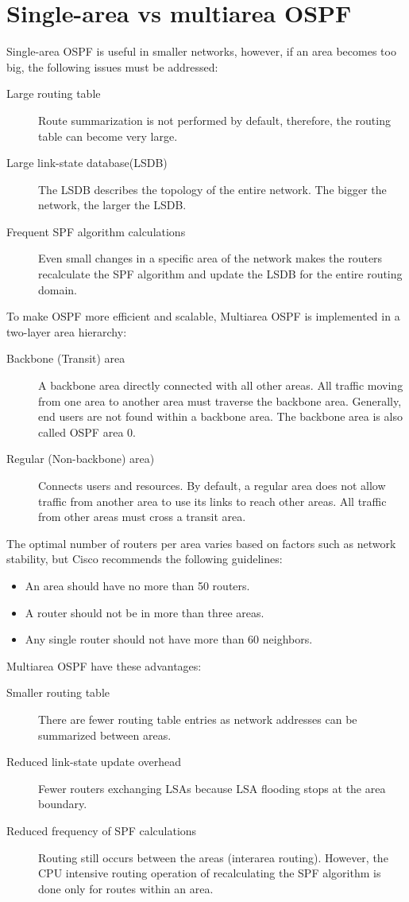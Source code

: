 \section{Single-area vs multiarea OSPF }
Single-area OSPF is useful in smaller networks, however, if an area becomes too big, the following issues must be addressed:
\begin{description}
	\item[Large routing table] Route summarization is not performed by default, therefore, the routing table can become very large.
	\item[Large link-state database(LSDB)] The LSDB describes the topology of the entire network. The bigger the network, the larger the LSDB.
	\item[Frequent SPF algorithm calculations] Even small changes in a specific area of the network makes the routers recalculate the SPF algorithm and update the LSDB for the entire routing domain.
	\end{description}
To make OSPF more efficient and scalable, Multiarea OSPF is implemented in a two-layer area hierarchy:
\begin{description}
	\item[Backbone (Transit) area] A backbone area directly connected with all other areas. All traffic moving from one area to another area must traverse the backbone area. Generally, end users are not found within a backbone area. The backbone area is also called OSPF area 0.
	\item[Regular (Non-backbone) area)] Connects users and resources. By default, a regular area does not allow traffic from another area to use its links to reach other areas. All traffic from other areas must cross a transit area.
	\end{description}
The optimal number of routers per area varies based on factors such as network stability, but Cisco recommends the following guidelines:
\begin{itemize}
	\item An area should have no more than 50 routers.
	\item A router should not be in more than three areas.
	\item Any single router should not have more than 60 neighbors.
	\end{itemize}
Multiarea OSPF have these advantages:
\begin{description}
	\item[Smaller routing table] There are fewer routing table entries as network addresses can be summarized between areas.
	\item[Reduced link-state update overhead] Fewer routers exchanging LSAs because LSA flooding stops at the area boundary.
	\item[Reduced frequency of SPF calculations] Routing still occurs between the areas (interarea routing). However, the CPU intensive routing operation of recalculating the SPF algorithm is done only for routes within an area.
	\end{description}